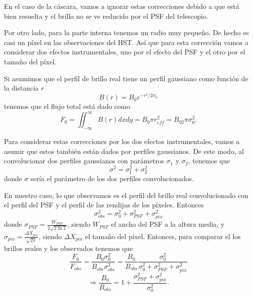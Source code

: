 \documentclass{book}
\begin{document}
En el caso de la cáscara, vamos a ignorar estas correcciones debido a que está bien resuelta y  el brillo no se ve reducido por el PSF del telescopio.

Por otro lado, para la parte interna tenemos un radio muy pequeño. De hecho es casi un píxel en las observaciones del HST. Así que para esta corrección vamos a considerar dos efectos instrumentales, uno por el efecto del PSF y el otro por el tamaño del píxel.

Si asumimos que el perfil de brillo real tiene un perfil gaussiano como función de la distancia $r$ 
\begin{equation}
B(r)= B_0 e^{-r^2/2\sigma_0}
\end{equation} 
tenemos que el flujo total está dado como 
\begin{equation}
F_0=\iint_{-\infty}^\infty B(r)dxdy=B_0 \pi r_{eff}^2=B_02\pi \sigma_0^2.
\end{equation}

Para considerar estas correcciones por los dos efectos instrumentales, vamos a asumir que estos también están dados por perfiles gaussianos. De este modo, al convolucionar dos perfiles gaussianos con parámetros $\sigma_1$ y $\sigma_2$, tenemos que 
\begin{equation}
\sigma^2=\sigma_1^2+\sigma_2^2
\end{equation}
donde $\sigma$ sería el parámetro de los dos perfiles convolucionados.

En nuestro caso, lo que observamos es el perfil del brillo real convolucionado con el perfil del PSF y el perfil de las rendijas de los píxeles. Entonces 
\begin{equation}
\sigma_{obs}^2=\sigma_0^2+\sigma_{PSF}^2+\sigma_{pix}^2
\end{equation}
donde $\sigma_{PSF}=\frac{W_{PSF}}{2\sqrt{2\ln{2}}}$, siendo $W_{PSF}$ el ancho del PSF a la altura media, y $\sigma_{pix}=\frac{\Delta X_{pix}}{\sqrt{2\pi}}$, siendo $\Delta X_{pix}$ el tamaño del píxel. Entonces, para comparar el los brillos reales y los observados tenemos que
\begin{equation}
\frac{F_0}{F_{obs}}=\frac{B_0\sigma_0^2}{B_{obs}\sigma_{obs}^2}=\frac{B_0}{B_{obs}}\frac{\sigma_0^2}{\sigma_0^2+\sigma_{PSF}^2+\sigma_{pix}^2}
\end{equation} 
\begin{equation}
\Rightarrow \frac{B_0}{B_{obs}}=1+\frac{\sigma_{PSF}^2+\sigma_{pix}^2}{\sigma_0^2}.
\end{equation}
\end{document}
